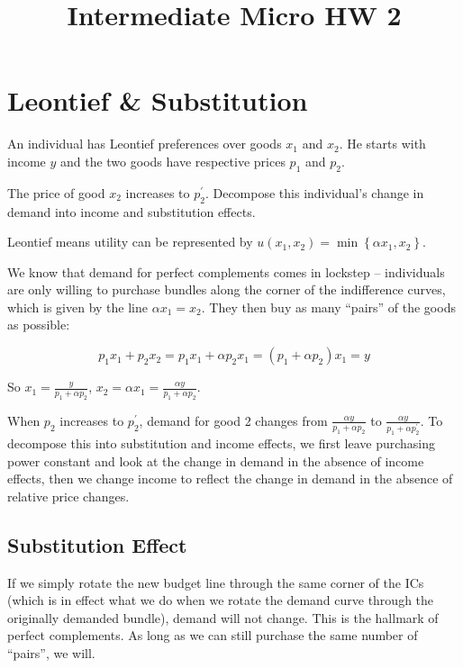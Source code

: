 \documentclass{article}
\begin{document}
\title{Intermediate Micro HW 2}

\maketitle

\section{Leontief \& Substitution}

An individual has Leontief preferences over goods $x_1$ and $x_2$. He starts with income $y$ and the two goods have respective prices $p_1$ and $p_2$.

The price of good $x_2$ increases to $p_2^{'}$. Decompose this individual's change in demand into income and substitution effects.

\color{red}
Leontief means utility can be represented by $u(x_1, x_2) = \min \left\{\alpha x_1, x_2 \right\}$.

We know that demand for perfect complements comes in lockstep -- individuals are only willing to purchase bundles along the corner of the indifference curves, which is given by the line $\alpha x_1 = x_2$. They then buy as many ``pairs'' of the goods as possible:

\[p_1 x_1 + p_2 x_2 = p_1 x_1 + \alpha p_2 x_1 = \left(p_1 + \alpha p_2 \right) x_1 = y\]

So $x_1 = \frac{y}{p_1 + \alpha p_2}$, $x_2 = \alpha x_1 = \frac{\alpha y}{p_1 + \alpha p_2}$.

When $p_2$ increases to $p_2^{'}$, demand for good 2 changes from $\frac{\alpha y}{p_1 + \alpha p_2}$ to $\frac{\alpha y}{p_1 + \alpha p_2^{'}}$. To decompose this into substitution and income effects, we first leave purchasing power constant and look at the change in demand in the absence of income effects, then we change income to reflect the change in demand in the absence of relative price changes.

\subsection*{Substitution Effect}

If we simply rotate the new budget line through the same corner of the ICs (which is in effect what we do when we rotate the demand curve through the originally demanded bundle), demand will not change. This is the hallmark of perfect complements. As long as we can still purchase the same number of ``pairs'', we will.
\end{document}
